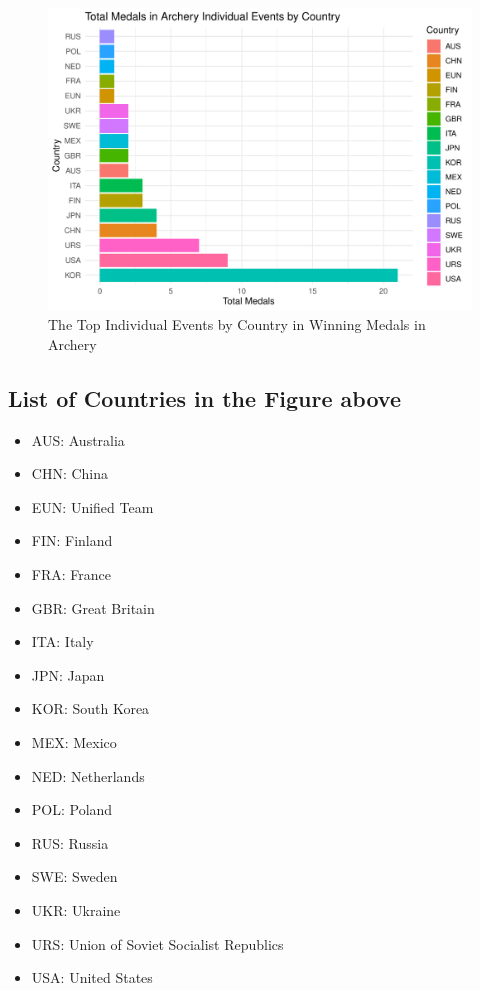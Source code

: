 \documentclass[
  12pt,
]{elsarticle}
\providecommand{\tightlist}{%
  \setlength{\itemsep}{0pt}\setlength{\parskip}{0pt}}
\begin{document}
\begin{figure}

{\centering \includegraphics{README_files/figure-latex/unnamed-chunk-4-1} 

}

\caption{The Top Individual Events by Country in Winning Medals in Archery\label{Figure4}}\label{fig:unnamed-chunk-4}
\end{figure}

\hypertarget{list-of-countries-in-the-figure-above}{%
\subsection{List of Countries in the Figure
above}\label{list-of-countries-in-the-figure-above}}

\begin{itemize}
\tightlist
\item
  AUS: Australia
\item
  CHN: China
\item
  EUN: Unified Team
\item
  FIN: Finland
\item
  FRA: France
\item
  GBR: Great Britain
\item
  ITA: Italy
\item
  JPN: Japan
\item
  KOR: South Korea
\item
  MEX: Mexico
\item
  NED: Netherlands
\item
  POL: Poland
\item
  RUS: Russia
\item
  SWE: Sweden
\item
  UKR: Ukraine
\item
  URS: Union of Soviet Socialist Republics
\item
  USA: United States
\end{itemize}
\end{document}
